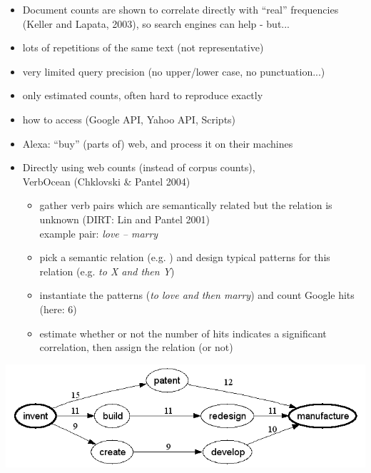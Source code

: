 \documentclass[a4paper,landscape,headrule,footrule,xetex]{foils}
\begin{document}
\begin{itemize}
\item Document counts are shown to correlate directly with ``real'' frequencies
(Keller and Lapata, 2003), so search engines can help - but...
\item lots of repetitions of the same text (not representative)
\item very limited query precision (no upper/lower case, no punctuation...)
\item only estimated counts, often hard to reproduce exactly
\item how to access (Google API, Yahoo API, Scripts)
\item Alexa: ``buy'' (parts of) web, and process it on their machines
\end{itemize}

\begin{itemize}
\item Directly using web counts (instead of corpus counts), 
 \\  VerbOcean  (Chklovski \& Pantel 2004)
  \begin{itemize}
  \item gather verb pairs which are semantically related but the relation is unknown
    (DIRT: Lin and Pantel 2001)
    \\ example pair: \textit{love -- marry}
  \item pick a semantic relation (e.g. ) and design typical patterns
    for this relation (e.g. \textit{to X and then Y})
  \item instantiate the patterns (\textit{to love and then marry}) and count Google hits
    (here: 6)
  \item estimate whether or not the number of hits indicates a significant
    correlation, then assign the relation (or not)
  \end{itemize}
\end{itemize}


\begin{center}
  \includegraphics[width=\textwidth]{../pics/invent-manufacture-hb3}
\end{center}
\end{document}

